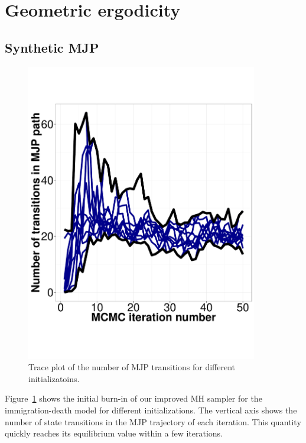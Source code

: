 \section{Geometric ergodicity}

\subsection{Synthetic MJP}

  \begin{figure}[H]
  \centering
  \begin{minipage}[hp]{0.45\linewidth}
  \centering
    \includegraphics [width=0.90\textwidth, angle=0]{figs/exp3_k2_path_transition.pdf}
      \end{minipage}
    \caption{Trace plot of the number of MJP transitions for different initializatoins.}
	\label{fig:Transition_exp}
  \end{figure}

Figure~\ref{fig:Transition_exp} shows the initial burn-in of our improved MH 
sampler for the immigration-death model for different initializations. The vertical 
axis shows the number of state transitions in the MJP trajectory of each iteration. 
This quantity quickly reaches its equilibrium value within a few iterations.\\

